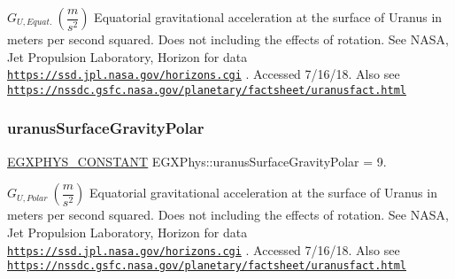$ G_{U,Equat.} \ (\dfrac{m}{s^2})$ Equatorial gravitational acceleration at the surface of Uranus in meters per second squared. Does not including the effects of rotation. See N\+A\+SA, Jet Propulsion Laboratory, Horizon for data \href{https://ssd.jpl.nasa.gov/horizons.cgi}{\tt https\+://ssd.\+jpl.\+nasa.\+gov/horizons.\+cgi} . Accessed 7/16/18. Also see \href{https://nssdc.gsfc.nasa.gov/planetary/factsheet/uranusfact.html}{\tt https\+://nssdc.\+gsfc.\+nasa.\+gov/planetary/factsheet/uranusfact.\+html} \mbox{\label{group___e_g_x_phys-_constants-_astrophysics-_solar_system-_uranus-_bulk_gaac7f0c911f8e118ff773010111851360}} 
\subsubsection{\texorpdfstring{uranus\+Surface\+Gravity\+Polar}{uranusSurfaceGravityPolar}}
{\footnotesize\ttfamily \mbox{\hyperlink{group___e_g_x_phys-_constants-_macros_ga76980d288494ce1714c9ac68a95ba702}{E\+G\+X\+P\+H\+Y\+S\+\_\+\+C\+O\+N\+S\+T\+A\+NT}} E\+G\+X\+Phys\+::uranus\+Surface\+Gravity\+Polar = 9.}

$ G_{U,Polar} \ (\dfrac{m}{s^2})$ Equatorial gravitational acceleration at the surface of Uranus in meters per second squared. Does not including the effects of rotation. See N\+A\+SA, Jet Propulsion Laboratory, Horizon for data \href{https://ssd.jpl.nasa.gov/horizons.cgi}{\tt https\+://ssd.\+jpl.\+nasa.\+gov/horizons.\+cgi} . Accessed 7/16/18. Also see \href{https://nssdc.gsfc.nasa.gov/planetary/factsheet/uranusfact.html}{\tt https\+://nssdc.\+gsfc.\+nasa.\+gov/planetary/factsheet/uranusfact.\+html} \mbox{\label{group___e_g_x_phys-_constants-_astrophysics-_solar_system-_uranus-_bulk_ga781508a60603feae345f1941de8204fa}} 
